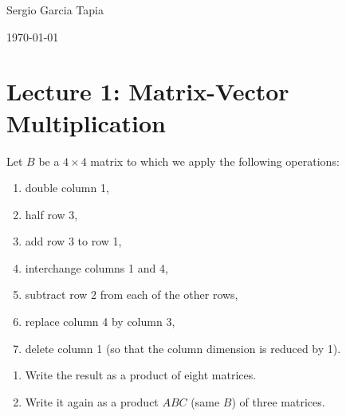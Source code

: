 \documentclass[12pt]{article}
\newenvironment{ex}[2][Exercise]{\begin{trivlist}
		\item[\hskip \labelsep {\bfseries #1}\hskip \labelsep {\bfseries #2.}]}{\end{trivlist}}
\begin{document}

\noindent Sergio Garcia Tapia \hfill

 \hfill 

 \hfill 

\noindent\today
\section*{Lecture 1: Matrix-Vector Multiplication}

\begin{ex}{1}
	Let $B$ be a $4\times 4$ matrix to which we apply the following operations:
	\begin{enumerate}
		\item double column 1,
		\item half row 3,
		\item add row 3 to row 1,
		\item interchange columns 1 and 4,
		\item subtract row 2 from each of the other rows,
		\item replace column 4 by column 3,
		\item delete column 1 (so that the column dimension is reduced by 1).
	\end{enumerate}
	\begin{enumerate}[label=(\alph*)]
		\item Write the result as a product of eight matrices.
		\item Write it again as a product $ABC$ (same $B$) of three matrices.
	\end{enumerate}
\end{ex}
\end{document}
